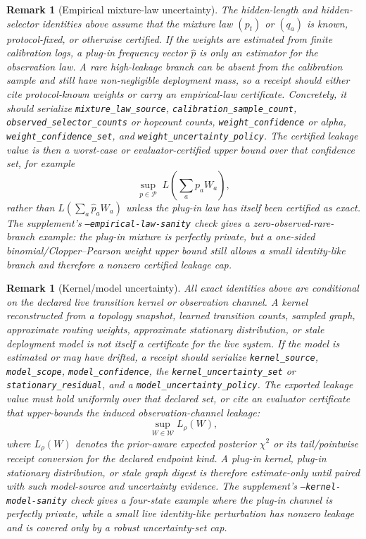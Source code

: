 \documentclass[11pt]{article}
\newtheorem{remark}[theorem]{Remark}
\begin{document}
\begin{remark}[Empirical mixture-law uncertainty]\label{rem:empirical-mixture-law}
The hidden-length and hidden-selector identities above assume that the mixture law
$(p_t)$ or $(q_a)$ is known, protocol-fixed, or otherwise certified.  If the
weights are estimated from finite calibration logs, a plug-in frequency vector
$\widehat p$ is only an estimator for the observation law.  A rare high-leakage
branch can be absent from the calibration sample and still have non-negligible
deployment mass, so a receipt should either cite protocol-known weights or carry
an empirical-law certificate.  Concretely, it should serialize
\nolinkurl{mixture_law_source}, \nolinkurl{calibration_sample_count},
\nolinkurl{observed_selector_counts} or hopcount counts,
\nolinkurl{weight_confidence} or alpha, \nolinkurl{weight_confidence_set}, and
\nolinkurl{weight_uncertainty_policy}.  The certified leakage value is then a
worst-case or evaluator-certified upper bound over that confidence set, for
example
\[
  \sup_{p\in\mathcal P}\; L\!\left(\sum_a p_a W_a\right),
\]
rather than $L(\sum_a \widehat p_a W_a)$ unless the plug-in law has itself been
certified as exact.  The supplement's \texttt{--empirical-law-sanity} check gives
a zero-observed-rare-branch example: the plug-in mixture is perfectly private,
but a one-sided binomial/Clopper--Pearson weight upper bound still allows a small
identity-like branch and therefore a nonzero certified leakage cap.
\end{remark}

\begin{remark}[Kernel/model uncertainty]\label{rem:kernel-model-uncertainty}
All exact identities above are conditional on the declared live transition kernel
or observation channel.  A kernel reconstructed from a topology snapshot, learned
transition counts, sampled graph, approximate routing weights, approximate
stationary distribution, or stale deployment model is not itself a certificate
for the live system.  If the model is estimated or may have drifted, a receipt
should serialize \nolinkurl{kernel_source}, \nolinkurl{model_scope},
\nolinkurl{model_confidence}, the \nolinkurl{kernel_uncertainty_set} or
\nolinkurl{stationary_residual}, and a \nolinkurl{model_uncertainty_policy}.  The
exported leakage value must hold uniformly over that declared set, or cite an
evaluator certificate that upper-bounds the induced observation-channel leakage:
\[
  \sup_{W\in\mathcal W} L_\rho(W),
\]
where $L_\rho(W)$ denotes the prior-aware expected posterior $\chi^2$ or its
tail/pointwise receipt conversion for the declared endpoint kind.  A plug-in
kernel, plug-in stationary distribution, or stale graph digest is therefore
estimate-only until paired with such model-source and uncertainty evidence.  The
supplement's \texttt{--kernel-model-sanity} check gives a four-state example
where the plug-in channel is perfectly private, while a small live identity-like
perturbation has nonzero leakage and is covered only by a robust uncertainty-set
cap.
\end{remark}
\end{document}

